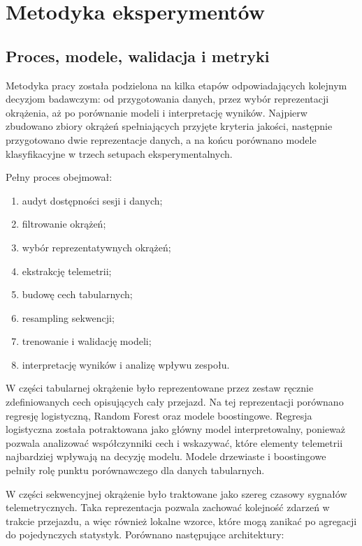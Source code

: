 \documentclass[printmode,pl]{mgr}
\begin{document}
\chapter{Metodyka eksperymentów}

\section{Proces, modele, walidacja i metryki}

Metodyka pracy została podzielona na kilka etapów odpowiadających kolejnym decyzjom badawczym: od przygotowania danych, przez wybór reprezentacji okrążenia, aż po porównanie modeli i interpretację wyników. Najpierw zbudowano zbiory okrążeń spełniających przyjęte kryteria jakości, następnie przygotowano dwie reprezentacje danych, a na końcu porównano modele klasyfikacyjne w trzech setupach eksperymentalnych.

Pełny proces obejmował:

\begin{enumerate}
    \item audyt dostępności sesji i danych;
    \item filtrowanie okrążeń;
    \item wybór reprezentatywnych okrążeń;
    \item ekstrakcję telemetrii;
    \item budowę cech tabularnych;
    \item resampling sekwencji;
    \item trenowanie i walidację modeli;
    \item interpretację wyników i analizę wpływu zespołu.
\end{enumerate}

W części tabularnej okrążenie było reprezentowane przez zestaw ręcznie zdefiniowanych cech opisujących cały przejazd. Na tej reprezentacji porównano regresję logistyczną, Random Forest oraz modele boostingowe. Regresja logistyczna została potraktowana jako główny model interpretowalny, ponieważ pozwala analizować współczynniki cech i wskazywać, które elementy telemetrii najbardziej wpływają na decyzję modelu. Modele drzewiaste i boostingowe pełniły rolę punktu porównawczego dla danych tabularnych.

W części sekwencyjnej okrążenie było traktowane jako szereg czasowy sygnałów telemetrycznych. Taka reprezentacja pozwala zachować kolejność zdarzeń w trakcie przejazdu, a więc również lokalne wzorce, które mogą zanikać po agregacji do pojedynczych statystyk. Porównano następujące architektury:
\end{document}
